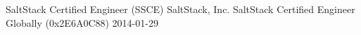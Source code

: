 \awarditem
    {SaltStack Certified Engineer (SSCE)}
    {SaltStack, Inc.}
    { SaltStack Certified Engineer Globally (0x2E6A0C88)}
    {2014-01-29}